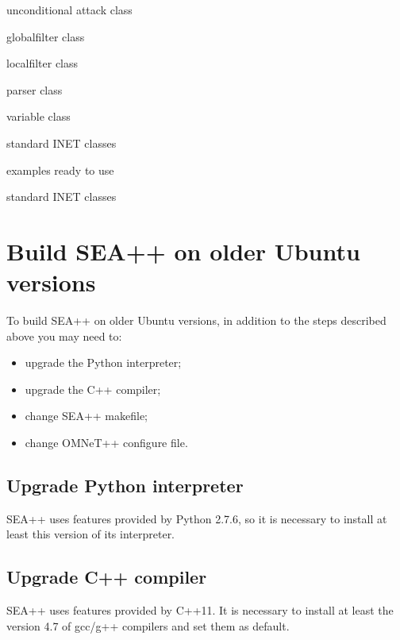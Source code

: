 \begin{description}[noitemsep]
			\item[] { unconditional attack class}
		\item[] { globalfilter class}
		\item[] { localfilter class}
		\item[] { parser class}
		\item[] { variable class}
		\item[] { standard INET classes}
	\item[] { examples ready to use}
	\item[] { standard INET classes}
\end{description}



\section{Build SEA++ on older Ubuntu versions}
To build SEA++ on older Ubuntu versions, in addition to the steps described above you may need to:
%
\begin{itemize}
\item upgrade the Python interpreter;
\item upgrade the C++ compiler;
\item change SEA++ makefile;
\item change OMNeT++ configure file.
\end{itemize}

\subsection{Upgrade Python interpreter}
SEA++ uses features provided by Python 2.7.6, so it is necessary to install at least this version of its interpreter.

\subsection{Upgrade C++ compiler}
SEA++ uses features provided by C++11. It is necessary to install at least the version 4.7 of gcc/g++ compilers and set them as default.


